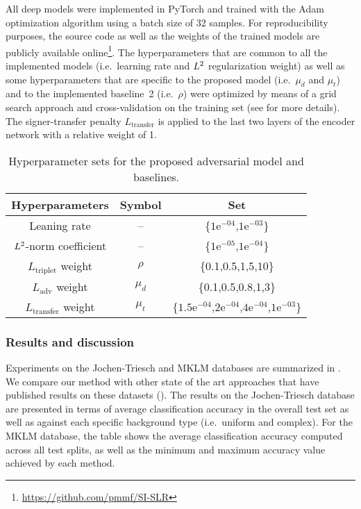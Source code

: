 All deep models were implemented in PyTorch and trained with the Adam optimization algorithm using a batch size of 32 samples. For reproducibility purposes, the source code as well as the weights of the trained models are publicly available online\footnote{\url{https://github.com/pmmf/SI-SLR}}. The hyperparameters that are common to all the implemented models (i.e.\ learning rate and $L^2$ regularization weight) as well as some hyperparameters that are specific to the proposed model (i.e.\ $\mu_d$ and $\mu_t$) and to the implemented baseline~2 (i.e.\ $\rho$) were optimized by means of a grid search approach and cross-validation on the training set (see  for more details). The signer-transfer penalty $L_{\text{transfer}}$ is applied to the last two layers of the encoder network with a relative weight of 1.

\begin{table}[t]
    \centering
        \begin{tabular}{c|c|c}
            Hyperparameters                    & Symbol & Set                \\ \hline
            Leaning rate                                & --      & \{$1\text{e}^{-04}$,$1\text{e}^{-03}$\}             \\
            $L^2$-norm coefficient                              & --       & \{$1\text{e}^{-05}$,$1\text{e}^{-04}$\}             \\
            $L_{\text{triplet}}$ weight                 & $\rho$                & \{0.1,0.5,1,5,10\}                  \\
            $L_{\text{adv}}$ weight                 & $\mu_d$                & \{0.1,0.5,0.8,1,3\}                  \\
            $L_{\text{transfer}}$ weight                 & $\mu_t$                & $\{1.5\text{e}^{-04}$,$2\text{e}^{-04}$,$4\text{e}^{-04}$,$1\text{e}^{-03}\}$
        \end{tabular}
    \caption{Hyperparameter sets for the proposed adversarial model and baselines.}
    \label{tab:hyperparam}
\end{table}

\subsubsection{Results and discussion}
Experiments on the Jochen-Triesch and MKLM databases are summarized in . We compare our method with other state of the art approaches that have published results on these datasets (\citet{Dahmani2014, Just2006, Kelly2010, Marin2014, Ferreira2018}). The results on the Jochen-Triesch database are presented in terms of average classification accuracy in the overall test set as well as against each specific background type (i.e.\ uniform and complex). For the MKLM database, the table shows the average classification accuracy computed across all test splits, as well as the minimum and maximum accuracy value achieved by each method.

